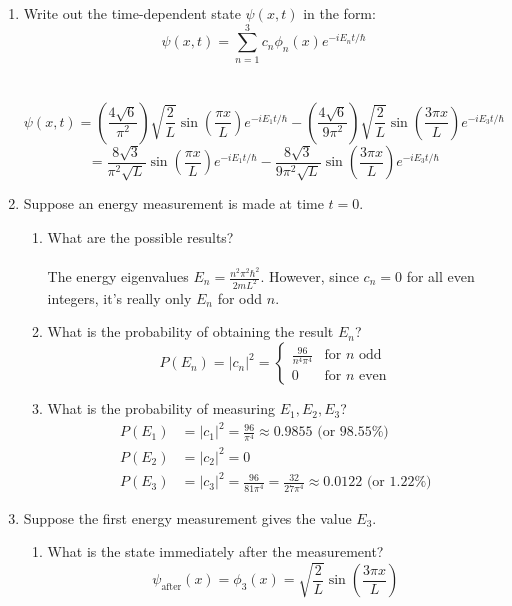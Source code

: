 \documentclass{article}
\begin{document}
\begin{enumerate}[label=\alph*.]
    \item Write out the time-dependent state $\psi(x, t)$ in the form:
    \[ \psi(x, t) = \sum_{n=1}^3 c_n\phi_n(x)e^{-iE_nt/\hbar} \]
    \\
    \\
    \[ \psi(x,t) = \left(\frac{4\sqrt{6}}{\pi^2}\right) \sqrt{\frac{2}{L}} \sin\left(\frac{\pi x}{L}\right) e^{-iE_1t/\hbar} - \left(\frac{4\sqrt{6}}{9\pi^2}\right) \sqrt{\frac{2}{L}} \sin\left(\frac{3\pi x}{L}\right) e^{-iE_3t/\hbar} \]
    \[ = \frac{8\sqrt{3}}{\pi^2\sqrt{L}} \sin\left(\frac{\pi x}{L}\right) e^{-iE_1t/\hbar} - \frac{8\sqrt{3}}{9\pi^2\sqrt{L}} \sin\left(\frac{3\pi x}{L}\right) e^{-iE_3t/\hbar} \]

    \item Suppose an energy measurement is made at time $t = 0$.
    \begin{enumerate}[label=\roman*.]
        \item What are the possible results?
        \\
        \\
        The energy eigenvalues $E_n = \frac{n^2\pi^2\hbar^2}{2mL^2}$. However, since $c_n = 0$ for all even integers, it's really only $E_n$ for odd $n$.
        
        \item What is the probability of obtaining the result $E_n$?
        \\
        \[ P(E_n) = |c_n|^2 = \begin{cases} \frac{96}{n^4\pi^4} & \text{for } n \text{ odd} \\ 0 & \text{for } n \text{ even} \end{cases} \]
        
        \item What is the probability of measuring $E_1, E_2, E_3$?
        \\
        \begin{align*}
            P(E_1) &= |c_1|^2 = \frac{96}{\pi^4} \approx 0.9855 \text{ (or } 98.55\%) \\
            P(E_2) &= |c_2|^2 = 0 \\
            P(E_3) &= |c_3|^2 = \frac{96}{81\pi^4} = \frac{32}{27\pi^4} \approx 0.0122 \text{ (or } 1.22\%)
        \end{align*}
    \end{enumerate}

    \item Suppose the first energy measurement gives the value $E_3$.
    \begin{enumerate}[label=\roman*.]
        \item What is the state immediately after the measurement?
        \\
        \[ \psi_{\text{after}}(x) = \phi_3(x) = \sqrt{\frac{2}{L}} \sin\left(\frac{3\pi x}{L}\right) \]
        

\end{enumerate}
\end{enumerate}
\end{document}

